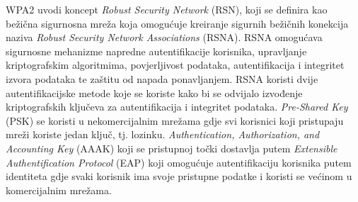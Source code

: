 \documentclass[times, utf8, diplomski]{fer}
\begin{document}
WPA2 uvodi koncept \emph{Robust Security Network} (RSN), koji se definira kao bežična sigurnosna mreža koja omogućuje kreiranje sigurnih bežičnih konekcija naziva \emph{Robust Security Network Associations} (RSNA). RSNA omogućava sigurnosne mehanizme napredne autentifikacije korisnika, upravljanje kriptografskim algoritmima, povjerljivost podataka, autentifikacija i integritet izvora podataka te zaštitu od napada ponavljanjem. RSNA koristi dvije autentifikacijske metode koje se koriste kako bi se odvijalo izvođenje kriptografskih ključeva za autentifikacija i integritet podataka. \emph{Pre-Shared Key} (PSK) se koristi u nekomercijalnim mrežama gdje svi korisnici koji pristupaju mreži koriste jedan ključ, tj. lozinku. \emph{Authentication, Authorization, and Accounting Key} (AAAK) koji se pristupnoj točki dostavlja putem \emph{Extensible Authentification Protocol} (EAP) koji omogućuje autentifikaciju korisnika putem identiteta gdje svaki korisnik ima svoje pristupne podatke i koristi se većinom u komercijalnim mrežama. 
\end{document}
